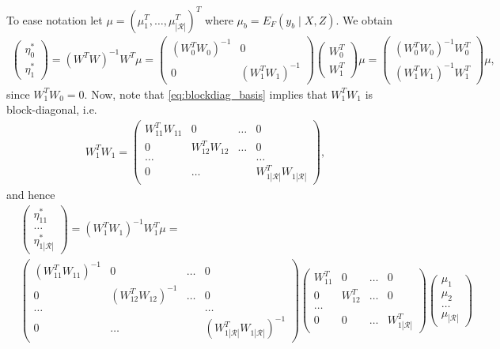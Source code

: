 To ease notation let $\mu= (\mu_1^T,\ldots,\mu_{|\mathcal{R}|}^T)^T$ where $\mu_b= E_F(y_b \mid X,Z)$. We obtain
\begin{align}
\begin{pmatrix} \eta_0^* \\ \eta_1^* \end{pmatrix}= (W^T W)^{-1} W^T \mu=
\begin{pmatrix} (W_0^T W_0)^{-1} & 0 \\ 0 & (W_1^T W_1)^{-1} \end{pmatrix} \begin{pmatrix} W_0^T \\ W_1^T \end{pmatrix} \mu=
\begin{pmatrix} (W_0^T W_0)^{-1} W_0^T \\ (W_1^T W_1)^{-1} W_1^T \end{pmatrix} \mu,
\nonumber    
\end{align}
since $W_1^T W_0=0$.
Now, note that \eqref{eq:blockdiag_basis} implies that $W_1^TW_1$ is block-diagonal, i.e.  
\begin{align}
W_1^T W_1= \begin{pmatrix} 
             W_{11}^T W_{11} & 0 & \ldots & 0 \\
                          0 & W_{12}^T W_{12} & \ldots & 0 \\
                    \ldots &   &       & \ldots \\
                          0 & \ldots     &   &       W_{1|\mathcal{R}|}^T W_{1|\mathcal{R}|}
\end{pmatrix},
\nonumber
\end{align}
and hence
\begin{align}
&\begin{pmatrix} \eta_{11}^* \\ \ldots \\ \eta_{1|\mathcal{R}|}^* \end{pmatrix}= (W_1^T W_1)^{-1} W_1^T \mu= 
\nonumber \\
&\begin{pmatrix} 
             (W_{11}^T W_{11})^{-1} & 0 & \ldots & 0 \\
                          0 & (W_{12}^T W_{12})^{-1} & \ldots & 0 \\
                    \ldots &   &       & \ldots \\
                          0 & \ldots     &   &       (W_{1|\mathcal{R}|}^T W_{1|\mathcal{R}|})^{-1}
\end{pmatrix}
\begin{pmatrix} W_{11}^T & 0 & \ldots & 0 \\ 
0 & W_{12}^T & \ldots & 0 \\
\ldots & & &  \\ 
0 & 0 & \ldots & W_{1|\mathcal{R}|}^T \end{pmatrix} 
\begin{pmatrix} \mu_1 \\ \mu_2 \\ \ldots \\ \mu_{|\mathcal{R}|} \end{pmatrix}
\nonumber
\end{align}
